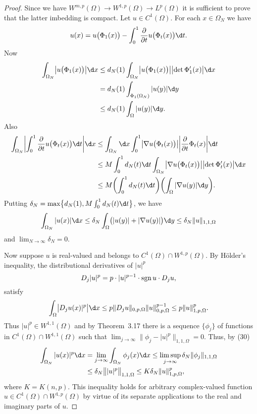 \begin{proof}
  Since we have $W^{m,p}(\Omega) \to W^{1,p}(\Omega) \to L^p(\Omega)$
  it is sufficient to prove that the latter imbedding is compact.
  Let $u\in C^1(\Omega)$. For each $x\in\Omega_N$ we have
  \[ u(x) = u\bigl(\Phi_1(x)\bigr)
      - \int_0^1 \frac{\partial}{\partial t} u\bigl(\Phi_t(x)\bigr) \d t. \]
  Now
  \begin{align*}
    \int_{\Omega_N} \bigl|u\bigl(\Phi_1(x)\bigr)\bigr| \d x
    & \leq d_N(1) \int_{\Omega_N} \bigl|u\bigl(\Phi_1(x)\bigr)\bigr|
        \bigl|\det\Phi_1'(x)\bigr| \d x \\
    & = d_N(1) \int_{\Phi_1(\Omega_N)} |u(y)| \d y \\
    & \leq d_N(1) \int_{\Omega} |u(y)| \d y.
  \end{align*}
  Also
  \begin{align*}
    \int_{\Omega_N} \biggl|\int_0^1 \frac{\partial}{\partial t} u\bigl(\Phi_t(x)\bigr) \d t \biggr| \d x
    & \leq \int_{\Omega_N} \d x \int_0^1 \bigl|\nabla u\bigl(\Phi_t(x)\bigr)\bigr|
        \biggl|\frac{\partial}{\partial t} \Phi_t(x)\biggr| \d t \\
    & \leq M \int_0^1 d_N(t) \d t \int_{\Omega_N} \bigl|\nabla u\bigl(\Phi_t(x)\bigr)\bigr|
        \bigl|\det\Phi_t'(x)\bigr| \d x \\
    & \leq M\biggl(\int_0^1 d_N(t) \d t\biggr) \biggl(\int_{\Omega} |\nabla u(y)| \d y\biggr).
  \end{align*}
  Putting $\delta_N = \max\bigl\{d_N(1), M \int_0^1 d_N(t)\d t\bigr\}$, we have
  \begin{equation}\label{eq:6.30}
    \int_{\Omega_N} |u(x)| \d x
    \leq \delta_N \int_{\Omega} \bigl(|u(y)| + |\nabla u(y)|\bigr) \d y
    \leq \delta_N \|u\|_{1,1,\Omega}
  \end{equation}
  and $\lim_{N\to\infty} \delta_N = 0$.

  Now suppose $u$ is real-valued and belongs to $C^1(\Omega)\cap W^{1,p}(\Omega)$.
  By H\"older's inequality, the distributional derivatives of $|u|^p$
  \[ D_j |u|^p = p\cdot |u|^{p-1}\cdot \operatorname{sgn} u\cdot D_j u, \]
  satisfy
  \[ \int_{\Omega} \bigl|D_j u(x)|^p\bigr| \d x
      \leq p\|D_ju\|_{0,p,\Omega} \|u\|_{0,p,\Omega}^{p-1} \leq p\|u\|_{1,p,\Omega}^p. \]
  Thus $|u|^p\in W^{1,1}(\Omega)$ and by Theorem~3.17 there is a sequence $\{\phi_j\}$
  of functions in $C^1(\Omega)\cap W^{1,1}(\Omega)$ such that
  $\lim_{j\to\infty} \bigl\|\phi_j - |u|^p\bigr\|_{1,1,\Omega} = 0$. Thus, by (30)
  \begin{align*}
    \int_{\Omega_N} |u(x)|^p \d x
    & = \lim_{j\to\infty} \int_{\Omega_N} \phi_j(x) \d x
      \leq \limsup_{j\to\infty} \delta_N \|\phi_j\|_{1,1,\Omega} \\
    & \leq \delta_N \bigl\| |u|^p \bigr\|_{1,1,\Omega}
      \leq K \delta_N \|u\|_{1,p,\Omega}^p,
  \end{align*}
  where $K=K(n,p)$. This inequality holds for arbitrary complex-valued function
  $u\in C^1(\Omega)\cap W^{1,p}(\Omega)$ by virtue of its separate applications
  to the real and imaginary parts of $u$.


\end{proof}
